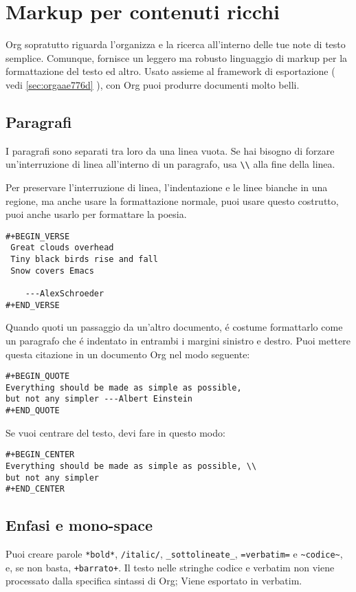 \documentclass[11pt]{article}
\begin{document}
\section[Markup]{Markup per contenuti ricchi}
\label{sec:org79fb7a1}
Org sopratutto riguarda l'organizza e la ricerca all'interno delle tue
note di testo semplice. Comunque, fornisce un leggero ma robusto
linguaggio di markup per la formattazione del testo ed altro. Usato
assieme al framework di esportazione ( vedi \ref{sec:orgaae776d} ), con Org
puoi produrre documenti molto belli.

\subsection{Paragrafi}
\label{sec:org619fb56}
I paragrafi sono separati tra loro da una linea vuota. Se hai bisogno
di forzare un'interruzione di linea all'interno di un paragrafo, usa
\texttt{\textbackslash{}\textbackslash{}} alla fine della linea.

Per preservare l'interruzione di linea, l'indentazione e le linee bianche
in una regione, ma anche usare la formattazione normale, puoi usare
questo costrutto, puoi anche usarlo per formattare la poesia.

\begin{verbatim}
#+BEGIN_VERSE
 Great clouds overhead
 Tiny black birds rise and fall
 Snow covers Emacs

    ---AlexSchroeder
#+END_VERSE
\end{verbatim}

Quando quoti un passaggio da un'altro documento, é costume formattarlo
come un paragrafo che é indentato in entrambi i margini sinistro e
destro. Puoi mettere questa citazione in un documento Org nel modo
seguente:

\begin{verbatim}
#+BEGIN_QUOTE
Everything should be made as simple as possible,
but not any simpler ---Albert Einstein
#+END_QUOTE
\end{verbatim}

Se vuoi centrare del testo, devi fare in questo modo:

\begin{verbatim}
#+BEGIN_CENTER
Everything should be made as simple as possible, \\
but not any simpler
#+END_CENTER
\end{verbatim}

\subsection{Enfasi e mono-space}
\label{sec:orgf6ead7f}
Puoi creare parole \texttt{*bold*}, \texttt{/italic/}, \texttt{\_sottolineate\_},
\texttt{=verbatim=} e \texttt{\textasciitilde{}codice\textasciitilde{}}, e, se non basta, \texttt{+barrato+}. Il testo
nelle stringhe codice e verbatim non viene processato dalla specifica
sintassi di Org; Viene esportato in verbatim.
\end{document}
